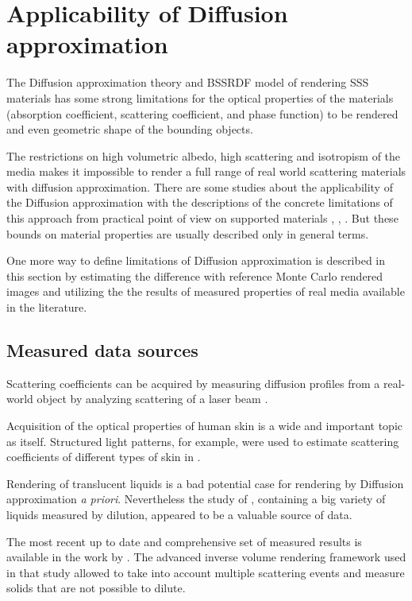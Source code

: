 \newpage
\section{Applicability of Diffusion approximation}
\label{chapter:measurements}

The Diffusion approximation theory and BSSRDF model of rendering SSS materials has some strong
limitations for the optical properties of the materials (absorption coefficient, scattering
coefficient, and phase function) to be rendered and even geometric shape of the bounding
objects.

The restrictions on high volumetric albedo, high scattering and isotropism of the media makes it
impossible to render a full range of real world scattering materials with diffusion approximation.
There are some studies about the applicability of the Diffusion approximation with the descriptions
of the concrete limitations of this approach from practical point of view on supported materials
\cite{Donner:2009:EBM}, \cite{Gkioulekas:2013:URP:2516971.2516972},
\cite{Zhao:2014:HSR:2601097.2601104}. But these bounds on material properties are usually described
only in general terms.

One more way to define limitations of Diffusion approximation is described in this
section by estimating the difference with reference Monte Carlo rendered images and utilizing the
the results of measured properties of real media available in the literature.

\subsection{Measured data sources}
Scattering coefficients can be acquired by measuring diffusion profiles from a real-world object by
analyzing scattering of a laser beam \cite{Jensen:2001:PMS:383259.383319}.

Acquisition of the optical properties of human skin is a wide and important topic as
itself. Structured light patterns, for example, were used to estimate scattering coefficients of
different types of skin in \cite{tariq_efficient_2006-1}.

Rendering of translucent liquids is a bad potential case for rendering by Diffusion approximation
\textit{a priori}. Nevertheless the study of \cite{Narasimhan:2006:ASP:1141911.1141986}, containing
a big variety of liquids measured by dilution, appeared to be a valuable source of data.

The most recent up to date and comprehensive set of measured results is available in the work by
\cite{Gkioulekas:2013:IVR:2508363.2508377}. The advanced inverse volume rendering framework used in
that study allowed to take into account multiple scattering events and measure solids that are not
possible to dilute.

